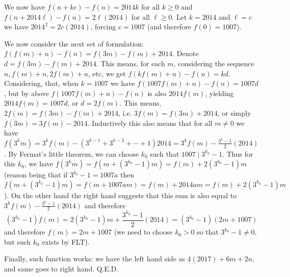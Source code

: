 \documentclass[11pt,a4paper]{article}
\begin{document}
\begin{enumerate}
	We now have $f(n+kc)-f(n)=2014k$ for all $k\ge 0$ and $f(n+2014\ell)-f(n)=2\ell(2014)$ for all $\ell\ge 0$. Let $k=2014$ and $\ell=c$ we have $2014^2=2c(2014)$, forcing $c=1007$ (and therefore $f(0)=1007$). 
	
	We now consider the next set of formulation: $f(f(m)+n)-f(n)=f(3m)-f(m)+2014$. Denote $d=f(3m)-f(m)+2014$. 
	This means, for each $m$, considering the sequence $n, f(m)+n, 2f(m)+n$, etc, we get $f(kf(m)+n)-f(n)=kd$. Considering, that, when $k=1007$ we have $f(1007f(m)+n)-f(n)=1007d$, but by above $f(1007f(m)+n)-f(n)$ is also $2014f(m)$, yielding $2014f(m)=1007d$, or $d=2f(m)$. This means, $2f(m)=f(3m)-f(m)+2014$, i.e. $3f(m)=f(3m)+2014$, or simply $f(3m)=3f(m)-2014$. Inductively this also means that for all $m\neq 0$ we have $f(3^km)=3^kf(m)-(3^{k-1}+3^{k-2}+\cdots + 1)2014=3^kf(m)-\frac{3^k-1}{2}(2014)$. By Fermat's little theorem, we can choose $k_0$ such that $1007\mid 3^{k_0}-1$. 
	Thus for this $k_0$, we have $f(3^km)=f(m+(3^{k_0}-1)m)=f(m)+2(3^{k_0}-1)m$ (reason being that if $3^{k_0}-1=1007a$ then $f(m+(3^{k_0}-1)m)=f(m+1007am)=f(m)+2014am=f(m)+2(3^{k_0}-1)m$). 
	On the other hand the right hand suggests that this sum is also equal to $3^kf(m)-\frac{3^k-1}{2}(2014)$ and therefore
	\[(3^{k_0}-1)f(m)=2(3^{k_0}-1)m + \frac{3^{k_0}-1}{2}(2014) = (3^{k_0}-1)(2m + 1007)
	\]
	and therefore $f(m)=2m+1007$ (we need to choose $k_0>0$ so that $3^{k_0}-1\neq 0$, but such $k_0$ exists by FLT). 
	
	Finally, such function works: we have the left hand side as $4(2017)+6m+2n$, and same goes to right hand. Q.E.D. 
	
\end{enumerate}
\end{document}
